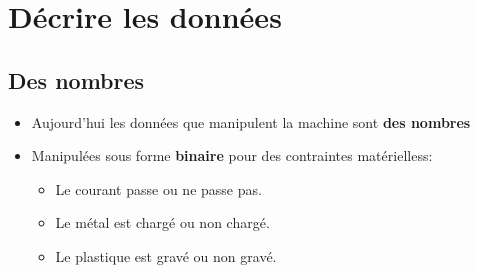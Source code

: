 \section[Décrire]{Décrire les données}
\subsection{Des nombres}

\begin{slide}
	\begin{itemize}
		\item Aujourd'hui les données que manipulent la machine sont \textbf{des nombres}
		\item Manipulées sous forme \textbf{binaire} pour des contraintes matérielless:
			\begin{itemize}
				\item Le courant passe ou ne passe pas.
				\item Le métal est chargé ou non chargé.
				\item Le plastique est gravé ou non gravé.
			\end{itemize}  
	\end{itemize}
\end{slide}

